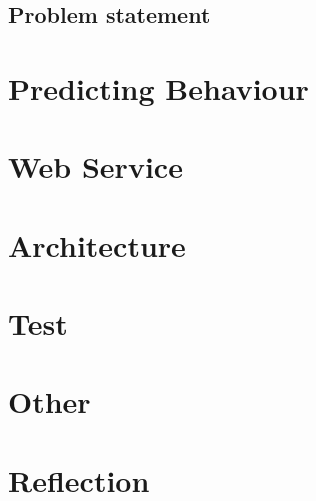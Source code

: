 \section{Problem statement}



\chapter{Predicting Behaviour}





\chapter{Web Service}




\chapter{Architecture}





\chapter{Test}




\chapter{Other}






\chapter{Reflection}



\appendix





